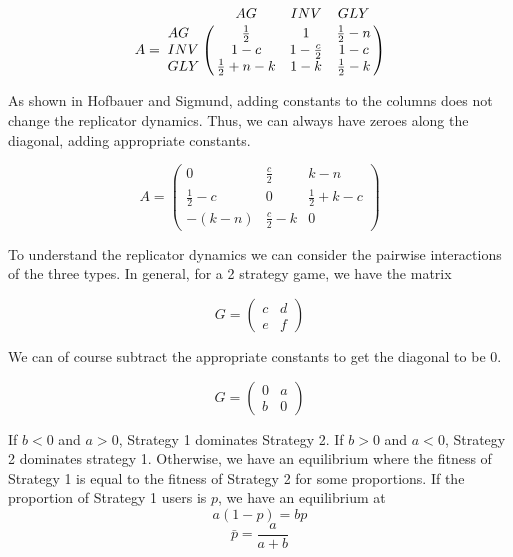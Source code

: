 \documentclass[12pt]{report}
\begin{document}
$$A = \bordermatrix{\text{}& AG & INV & GLY\cr
                AG & \frac{1}{2} & 1 & \frac{1}{2} - n \cr
                INV & 1 - c  &  1 - \frac{c}{2} & 1 - c \cr
                GLY & \frac{1}{2}+n-k & 1-k & \frac{1}{2}-k \cr
               }$$







As shown in Hofbauer and Sigmund, adding constants to the columns does not change the replicator dynamics. Thus, we can always have zeroes along the diagonal, adding appropriate constants. 

$$ A = \begin{pmatrix}
0 & \frac{c}{2} & k - n \\
\frac{1}{2} - c & 0 &\frac{1}{2} + k - c \\
- (k - n) & \frac{c}{2} - k & 0
\end{pmatrix} $$

To understand the replicator dynamics we can consider the pairwise interactions of the three types. In general, for a 2 strategy game, we have the matrix

$$G = \begin{pmatrix}
c & d \\
e & f 
\end{pmatrix}$$

We can of course subtract the appropriate constants to get the diagonal to be 0. 

$$G = \begin{pmatrix}
0 & a \\
b & 0 
\end{pmatrix} $$

If $b < 0$ and $a > 0$, Strategy 1 dominates Strategy 2. If $b > 0$ and $a < 0$, Strategy 2 dominates strategy 1. Otherwise, we have an equilibrium where the fitness of Strategy 1 is equal to the fitness of Strategy 2 for some proportions. If the proportion of Strategy 1 users is $p$, we have an equilibrium at 
$$ a (1 - p) = b p$$
$$\bar{p} = \frac{a}{a+b}$$
\end{document}
